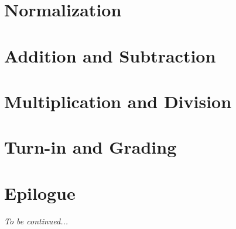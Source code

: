     \section{Normalization}                                             

    \section{Addition and Subtraction}                                  

    \section{Multiplication and Division}                               

    \section{Turn-in and Grading}                                       

    \section*{Epilogue}                                                 \GoingBackToTheZoo

    \textit{To be continued...}


